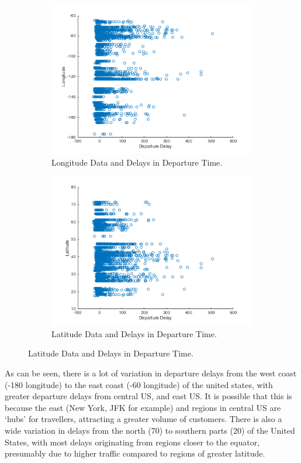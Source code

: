 \documentclass[a4paper, 10pt]{article}
\begin{document}
\begin{figure}[H]
\begin{subfigure}{.6\textwidth}
  \includegraphics[width=.8\linewidth]{long2}
  \caption{Longitude Data and Delays in Departure Time.}
\end{subfigure}%
\begin{subfigure}{.6\textwidth}
  \includegraphics[width=.8\linewidth]{lat2}
  \caption{Latitude Data and Delays in Departure Time.}
\end{subfigure}
\end{figure}

As can be seen, there is a lot of variation in departure delays from the west coast (-180 longitude) to the east coast (-60 longitude) of the united states, with greater departure delays from central US, and east US. It is possible that this is because the east (New York, JFK for example) and regions in central US are `hubs' for travellers, attracting a greater volume of customers. There is also a wide variation in delays from the north (70) to southern parts (20) of the United States, with most delays originating from regions closer to the equator, presumably due to higher traffic compared to regions of greater latitude.
\end{document}
